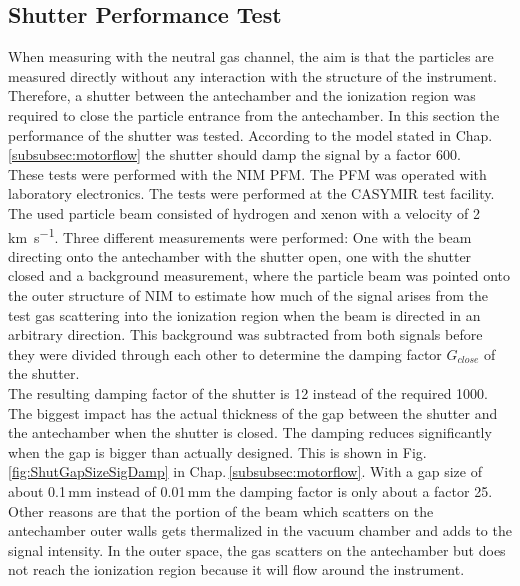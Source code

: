 	\subsection{Shutter Performance Test }
	When measuring with the neutral gas channel, the aim is that the particles are measured directly without any interaction with the structure of the instrument. Therefore, a shutter between the antechamber and the ionization region was required to close the particle entrance from the antechamber. In this section the performance of the shutter was tested. According to the model stated in Chap.\ref{subsubsec:motorflow} the shutter should damp the signal by a factor 600.\\
	These tests were performed with the NIM PFM. The PFM was operated with laboratory electronics. The tests were performed at the CASYMIR test facility. The used particle beam consisted of hydrogen and xenon with a velocity of 2\,\si{\kilo\meter\per\second}. Three different measurements were performed: One with the beam directing onto the antechamber with the shutter open, one with the shutter closed and a background measurement, where the particle beam was pointed onto the outer structure of NIM to estimate how much of the signal arises from the test gas scattering into the ionization region when the beam is directed in an arbitrary direction. This background was subtracted from both signals before they were divided through each other to determine the damping factor $G_{close}$ of the shutter.\\
	The resulting damping factor of the shutter is 12 instead of the required 1000. The biggest impact has the actual thickness of the gap between the shutter and the antechamber when the shutter is closed. The damping reduces significantly when the gap is bigger than actually designed. This is shown in Fig.\,\ref{fig:ShutGapSizeSigDamp} in Chap.\,\ref{subsubsec:motorflow}. With a gap size of about 0.1\,mm instead of 0.01\,mm the damping factor is only about a factor 25. Other reasons are that the portion of the beam which scatters on the antechamber outer walls gets thermalized in the vacuum chamber and adds to the signal intensity. In the outer space, the gas scatters on the antechamber but does not reach the ionization region because it will flow around the instrument.
	
